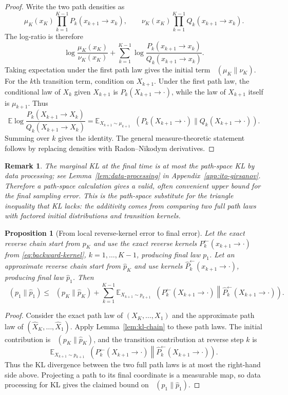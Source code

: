 \documentclass[10pt,a4paper]{amsart}
\numberwithin{equation}{section}
\newtheorem{prop}[theorem]{Proposition}
\newtheorem*{remark}{Remark}
\DeclareMathOperator{\KL}{D_{\mathsf{KL}}}
\newcommand{\E}{\mathbb{E}}
\newcommand{\wh}[1]{\widehat{#1}}
\begin{document}
\begin{proof}
Write the two path densities as
\[
    \mu_K(x_K)\prod_{k=1}^{K-1}P_k(x_{k+1} \to x_k),
    \qquad
    \nu_K(x_K)\prod_{k=1}^{K-1}Q_k(x_{k+1} \to x_k).
\]
The log-ratio is therefore
\[
    \log\frac{\mu_K(x_K)}{\nu_K(x_K)}
    +
    \sum_{k=1}^{K-1}
    \log\frac{P_k(x_{k+1} \to x_k)}{Q_k(x_{k+1} \to x_k)}.
\]
Taking expectation under the first path law gives the initial term
$\KL(\mu_K\|\nu_K)$.  For the $k$th transition term, condition on
$X_{k+1}$.  Under the first path law, the conditional law of $X_k$ given
$X_{k+1}$ is $P_k(X_{k+1} \to \cdot)$, while the law of $X_{k+1}$ itself is
$\mu_{k+1}$.  Thus
\[
    \E
    \log\frac{P_k(X_{k+1} \to X_k)}{Q_k(X_{k+1} \to X_k)}
    =
    \E_{X_{k+1}\sim\mu_{k+1}}
    \KL(P_k(X_{k+1} \to \cdot)\|Q_k(X_{k+1} \to \cdot)).
\]
Summing over $k$ gives the identity.  The general measure-theoretic statement
follows by replacing densities with Radon--Nikodym derivatives.
\end{proof}

\begin{remark}
The marginal KL at the final time is at most the path-space KL by data
processing; see Lemma~\ref{lem:data-processing} in Appendix~\ref{app:ito-girsanov}.
Therefore a path-space calculation gives a valid, often convenient upper bound
for the final sampling error.  This is the path-space substitute for the triangle
inequality that KL lacks: the additivity comes from comparing two full path laws
with factored initial distributions and transition kernels.
\end{remark}

\begin{prop}[From local reverse-kernel error to final error]
\label{prop:local-to-global}
Let the exact reverse chain start from $p_K$ and use the exact reverse kernels
$P_k^{\leftarrow}(x_{k+1} \to \cdot)$ from \eqref{eq:backward-kernel},
$k=1,\ldots,K-1$, producing final law $p_1$.
Let an approximate reverse chain start from $\wh p_K$ and use kernels
$\wh P_k^{\leftarrow}(x_{k+1} \to \cdot)$, producing final law $\wh p_1$.  Then
\[
    \KL(p_1\|\wh p_1)
    \leq
    \KL(p_K\|\wh p_K)
    +
    \sum_{k=1}^{K-1}
    \E_{X_{k+1}\sim p_{k+1}}
    \KL\!\left(
        P_k^{\leftarrow}(X_{k+1} \to \cdot)
        \middle\|
        \wh P_k^{\leftarrow}(X_{k+1} \to \cdot)
    \right).
\]
\end{prop}

\begin{proof}
Consider the exact path law of $(X_K,\ldots,X_1)$ and the approximate path law
of $(\wh X_K,\ldots,\wh X_1)$.  Apply Lemma~\ref{lem:kl-chain} to these path
laws.
The initial contribution is $\KL(p_K\|\wh p_K)$, and the transition
contribution at reverse step $k$ is
\[
    \E_{X_{k+1}\sim p_{k+1}}
    \KL\!\left(
        P_k^{\leftarrow}(X_{k+1} \to \cdot)
        \middle\|
        \wh P_k^{\leftarrow}(X_{k+1} \to \cdot)
    \right).
\]
Thus the KL divergence between the two full path laws is at most the right-hand
side above.  Projecting a path to its final coordinate is a measurable map, so
data processing for KL gives the claimed bound on $\KL(p_1\|\wh p_1)$.
\end{proof}
\end{document}
